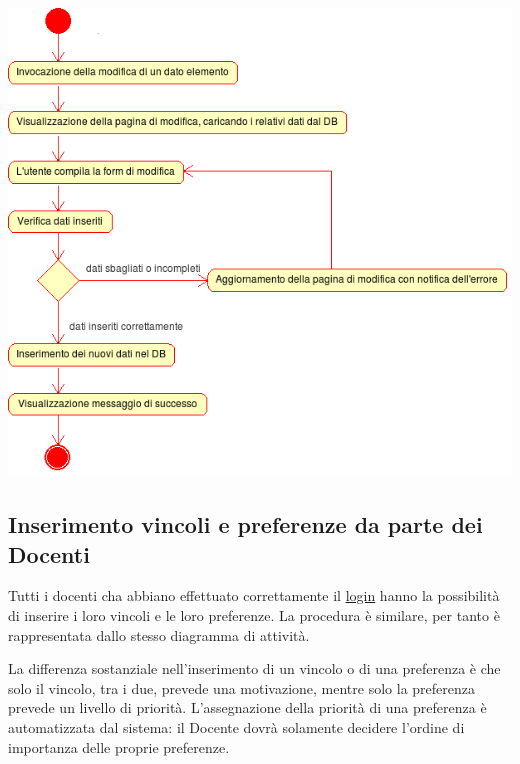 \documentclass[11pt,a4paper]{article}
\begin{document}
\begin{center}
 \includegraphics[scale=0.85]{images/modifica_dati.png}
\end{center}

\newpage
\subsection{Inserimento vincoli e preferenze da parte dei Docenti}
Tutti i docenti cha abbiano effettuato correttamente il \underline{login} hanno la possibilità di inserire i loro vincoli e le loro preferenze. La procedura è similare, per tanto è rappresentata dallo stesso diagramma di attività.

La differenza sostanziale nell'inserimento di un vincolo o di una preferenza è che solo il vincolo, tra i due, prevede una motivazione, mentre solo la preferenza prevede un livello di priorità. L'assegnazione della priorità di una preferenza è automatizzata dal sistema: il Docente dovrà solamente decidere l'ordine di importanza delle proprie preferenze.
\end{document}
